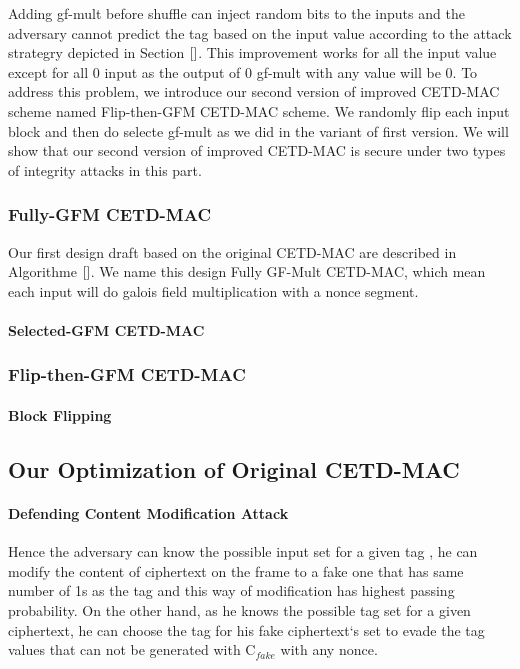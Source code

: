 \documentclass{article}
\begin{document}
Adding gf-mult before shuffle can inject random bits to the inputs and the
adversary cannot predict the tag based on the input value according to the
attack strategry depicted in Section $\ref{}$. This improvement works for all
the input value except for all 0 input as the output of 0 gf-mult with any value
will be 0. To address this problem, we introduce our second version of improved
CETD-MAC scheme named Flip-then-GFM CETD-MAC scheme. We randomly flip each input
block and then do selecte gf-mult as we did in the variant of first version. We
will show that our second version of improved CETD-MAC is secure under two types
of integrity attacks in this part. 
\subsubsection{Fully-GFM CETD-MAC}
Our first design draft based on the original CETD-MAC are described in
Algorithme $\ref{}$. We name this design Fully GF-Mult CETD-MAC, which mean each
input will do galois field multiplication with a nonce segment.  
\paragraph{}
\paragraph{Selected-GFM CETD-MAC}

\subsubsection{Flip-then-GFM CETD-MAC}

\paragraph{Block Flipping}
\subsection{Our Optimization of Original CETD-MAC}
\paragraph{Defending Content Modification Attack}
Hence the adversary can know the possible input set for a given tag , he can modify the content of ciphertext on the frame to a fake one that has same number of 1s as the tag and this way of modification has highest passing probability. On the other hand, as he knows the possible tag set for a given ciphertext, he can choose the tag for his fake ciphertext`s set to evade the tag values that can not be generated with C$_{fake}$ with any nonce. 
\end{document}
